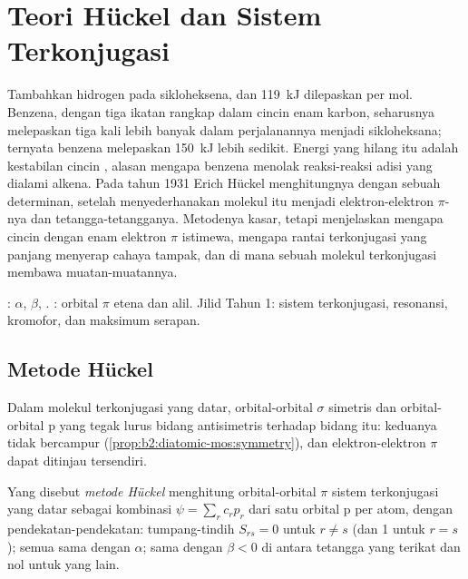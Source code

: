 \chapter{Teori Hückel dan Sistem Terkonjugasi}\label{ch:b2:huckel}

Tambahkan hidrogen pada sikloheksena, dan \qty{119}{kJ} dilepaskan per mol.
Benzena, dengan tiga ikatan rangkap dalam cincin enam karbon, seharusnya
melepaskan tiga kali lebih banyak dalam perjalanannya menjadi
sikloheksana; ternyata benzena melepaskan \qty{150}{kJ} lebih sedikit.
Energi yang hilang itu adalah kestabilan cincin , alasan mengapa
benzena menolak reaksi-reaksi adisi yang dialami alkena. Pada tahun 1931
Erich Hückel menghitungnya dengan sebuah determinan, setelah menyederhanakan
molekul itu menjadi elektron-elektron $\pi$-nya dan tetangga-tetangganya.
Metodenya kasar, tetapi menjelaskan mengapa cincin dengan enam elektron
$\pi$ istimewa, mengapa rantai terkonjugasi yang panjang menyerap cahaya
tampak, dan di mana sebuah molekul terkonjugasi membawa muatan-muatannya.

\begin{recall}
:  $\alpha$, 
$\beta$, . : orbital $\pi$
etena dan alil. Jilid Tahun 1: sistem terkonjugasi, resonansi, kromofor,
dan maksimum serapan.
\end{recall}

\section{Metode Hückel}

Dalam molekul terkonjugasi yang datar, orbital-orbital $\sigma$ simetris
dan orbital-orbital p yang tegak lurus bidang antisimetris terhadap bidang
itu: keduanya tidak bercampur (\cref{prop:b2:diatomic-mos:symmetry}), dan
elektron-elektron $\pi$ dapat ditinjau tersendiri.

\begin{definition}\label{def:b2:huckel:method}
Yang disebut \emph{metode Hückel} menghitung
orbital-orbital $\pi$ sistem terkonjugasi yang datar sebagai kombinasi
$\psi = \sum_r c_r p_r$ dari satu orbital p per atom, dengan
pendekatan-pendekatan: tumpang-tindih $S_{rs} = 0$ untuk $r \neq s$ (dan 1
untuk $r =
s$); semua  sama dengan $\alpha$;  sama dengan $\beta < 0$ di antara tetangga yang terikat dan nol
untuk yang lain.
\end{definition}

